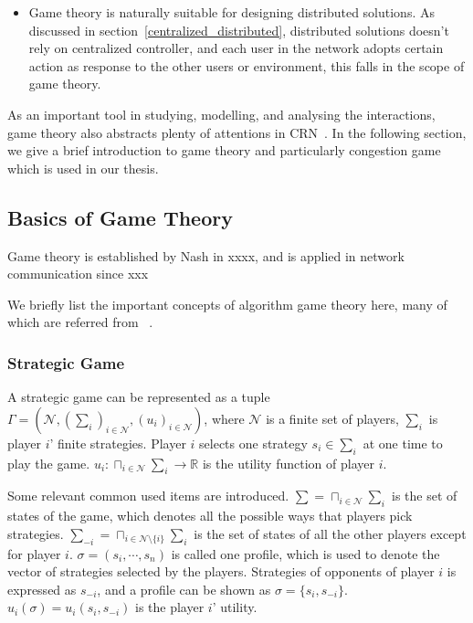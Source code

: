 \begin{itemize}
\item Game theory is naturally suitable for designing distributed solutions.
As discussed in section~\ref{centralized_distributed}, distributed solutions doesn't rely on centralized controller, and each user in the network adopts certain action as response to the other users or environment, this falls in the scope of game theory.
\end{itemize}

As an important tool in studying, modelling, and analysing the interactions, game theory also abstracts plenty of attentions in CRN~\cite{Neel06analysisand, Wang_gtc_crn_survey_2010}.
In the following section, we give a brief introduction to game theory and particularly congestion game which is used in our thesis. 

\subsection{Basics of Game Theory}
Game theory is established by Nash in xxxx, and is applied in network communication since xxx

We briefly list the important concepts of algorithm game theory here, many of which are referred from ~\cite{agt_book}.


\subsubsection{Strategic Game}

A strategic game can be represented as a tuple $\Gamma = (\mathcal{N}, (\sum_i)_{i \in \mathcal{N}}, (u_i)_{i\in \mathcal{N}})$, where $\mathcal{N}$ is a finite set of players, $\sum_i$ is player $i$' finite strategies.
Player $i$ selects one strategy $s_i\in \sum_i$ at one time to play the game.
$u_i:\sqcap_{i\in \mathcal{N}}\sum_i\rightarrow \mathbb{R} $ is the utility function of player $i$.

Some relevant common used items are introduced.
$\sum=\sqcap_{i\in \mathcal{N}}\sum_i$ is the set of states of the game, which denotes all the possible ways that players pick strategies.
$\sum_{-i}=\sqcap_{i\in \mathcal{N}\setminus \{i\}}\sum_i$ is the set of states of all the other players except for player $i$.
$\sigma=(s_i,\cdots,s_n)$ is called one profile, which is used to denote the vector of strategies selected by the players.
Strategies of opponents of player $i$ is expressed as $s_{-i}$, and a profile can be shown as $\sigma=\{s_i, s_{-i}\}$.
$u_i(\sigma) = u_i(s_i, s_{-i})$ is the player $i$' utility.

